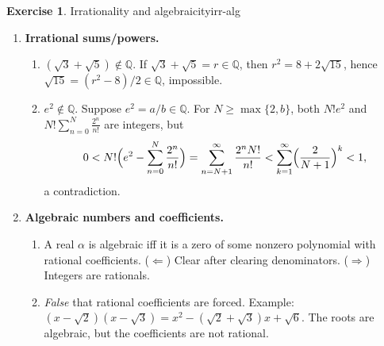 \documentclass[11pt,a4paper]{article}
\theoremstyle{definition}
\newtheorem{exercise}{Exercise} %
\theoremstyle{definition}
\theoremstyle{plain}
\theoremstyle{remark}
\begin{document}
\begin{exercise}{Irrationality and algebraicity}{irr-alg}
	\begin{enumerate}
		\item \textbf{Irrational sums/powers.}
		\begin{enumerate}
			\item $(\sqrt3+\sqrt5)\notin\mathbb Q$. If $\sqrt3+\sqrt5=r\in\mathbb Q$, then
			$r^2=8+2\sqrt{15}$, hence $\sqrt{15}=(r^2-8)/2\in\mathbb Q$, impossible.
			\item $e^2\notin\mathbb Q$. Suppose $e^2=a/b\in\mathbb Q$. For $N\ge\max\{2,b\}$,
			both $N!e^2$ and $N!\sum_{n=0}^{N}\frac{2^n}{n!}$ are integers, but
			\[
			0<N!\Bigl(e^2-\sum_{n=0}^{N}\frac{2^n}{n!}\Bigr)
			=\sum_{n=N+1}^{\infty}\frac{2^n N!}{n!}
			<\sum_{k=1}^{\infty}\Bigl(\frac{2}{N+1}\Bigr)^k<1,
			\]
			a contradiction.
		\end{enumerate}
		
		\item \textbf{Algebraic numbers and coefficients.}
		\begin{enumerate}
			\item A real $\alpha$ is algebraic iff it is a zero of some nonzero polynomial
			with rational coefficients. ($\Leftarrow$) Clear after clearing denominators.
			($\Rightarrow$) Integers are rationals.
			\item \emph{False} that rational coefficients are forced. Example:
			$(x-\sqrt2)(x-\sqrt3)=x^2-(\sqrt2+\sqrt3)x+\sqrt6$. The roots are algebraic,
			but the coefficients are not rational.
		\end{enumerate}
	\end{enumerate}
\end{exercise}


	
\end{document}
